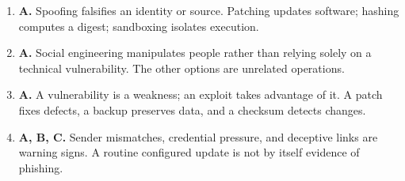 \begin{enumerate}[label=\textbf{Q\arabic*.}, leftmargin=*]
\item \textbf{A.} Spoofing falsifies an identity or source. Patching updates software; hashing computes a digest; sandboxing isolates execution.

\item \textbf{A.} Social engineering manipulates people rather than relying solely on a technical vulnerability. The other options are unrelated operations.

\item \textbf{A.} A vulnerability is a weakness; an exploit takes advantage of it. A patch fixes defects, a backup preserves data, and a checksum detects changes.

\item \textbf{A, B, C.} Sender mismatches, credential pressure, and deceptive links are warning signs. A routine configured update is not by itself evidence of phishing.

\end{enumerate}
